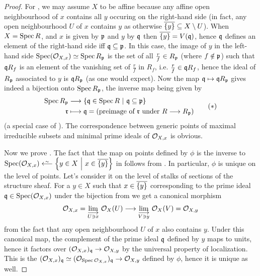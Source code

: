 \documentclass[a4paper,parskip=half,numbers=enddot, DIV=12]{scrreprt}
\begin{document}
\begin{proof}
    For , we may assume $X$ to be affine because any affine open neighbourhood of $x$ contains all $y$ occuring on the right-hand side (in fact, any open neighbourhood $U$ of $x$ contains $y$ as otherwise $\overline{\{y\}}\subseteq X\setminus U$). When $X=\operatorname{Spec} R$, and $x$ is given by $\mathfrak{p}$ and $y$ by $\mathfrak{q}$ then $\overline{\{y\}} = V(\mathfrak{q})$, hence $\mathfrak{q}$ defines an element of the right-hand side iff $\mathfrak{q}\subseteq \mathfrak{p}$. In this case, the image of $y$ in the left-hand side $\operatorname{Spec}(\mathcal{O}_{X,x})\simeq \operatorname{Spec} R_{\mathfrak{p}}$ is the set of all $\frac{r}{f}\in R_{\mathfrak{p}}$ (where $f\notin\mathfrak{p}$) such that $\mathfrak{q} R_f$ is an element of the vanishing set of $\frac{r}{f}$ in $R_f$, i.e. $\frac{r}{f}\in \mathfrak{q} R_f$, hence the ideal of $R_{\mathfrak{p}}$ associated to $y$ is $\mathfrak{q} R_{\mathfrak{p}}$ (as one would expect). Now the map $\mathfrak{q}\mapsto\mathfrak{q} R_{\mathfrak{p}}$ gives indeed a bijection onto $\operatorname{Spec} R_{\mathfrak{p}}$, the inverse map being given by 
    \begin{align}\lbl{eq:localizationBijection}
    	\begin{split}
	    	\Spec R_\pp &\morphism \left\{\qq\in\Spec R\st\qq\subseteq\pp\right\}\\ \rr&\longmapsto \qq= (\text{preimage of }\rr\text{ under }R\morphism R_\pp)
    	\end{split}\tag{$*$}
    \end{align}
    (a special case of \cite[Corollary~2.3.1]{alg1}). The correspondence between generic points of maximal irreducible subsets and minimal prime ideals of $\mathcal{O}_{X,x}$ is obvious.
    
    Now we prove . The fact that the map on points defined by $\phi$ is the inverse to $\Spec(\Oo_{X,x}) \lisomorphism \left\{y\in X\st x\in \ov{\{y\}}\right\}$ in  follows from . In particular, $\phi$ is unique on the level of points. Let's consider it on the level of stalks of sections of the structure sheaf. For a $y\in X$ such that $x\in\overline{\{y\}}$ corresponding to the prime ideal $\mathfrak{q}\in\operatorname{Spec}(\mathcal{O}_{X,x})$ under the bijection from  we get a canonical morphism
    \begin{align*}
        \Oo_{X,x} = \colimit[U\ni x] \Oo_X(U) \morphism \colimit[V\ni y] \Oo_X(V)=\Oo_{X,y}
    \end{align*}
    from the fact that any open neighbourhood $U$ of $x$ also contains $y$. Under this canonical map, the complement of the prime ideal $\mathfrak{q}$ defined by $y$ maps to units, hence it factors over $(\Oo_{X,x})_\qq\morphism \Oo_{X,y}$ by the universal property of localization. This is the $(\Oo_{X,x})_\qq \simeq (\Oo_{\Spec \Oo_{X,x}})_\qq \morphism \Oo_{X,y}$ defined by $\phi$, hence it is unique as well.
\end{proof}
\end{document}

